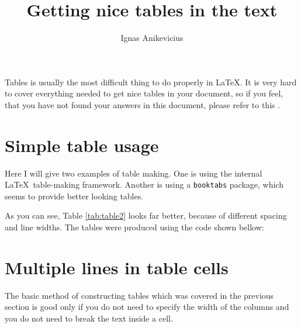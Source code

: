 

\usepackage[]{amsmath}
\usepackage{blindtext}
\usepackage{multicol}
\usepackage[english,british]{babel}

\usepackage{stfloats}
\usepackage{booktabs}
\usepackage{array}

\title{Getting nice tables in the text}
\author{Ignas Anikevicius}



\maketitle

Tables is usually the most difficult thing to do properly in \LaTeX . It is very
hard to cover everything needed to get nice tables in your document, so if you
feel, that you have not found your answers in this document, please refer to
this 
.

\tableofcontents

\section{Simple table usage}

Here I will give two examples of table making. One is using the internal \LaTeX\
table-making framework. Another is using a \verb|booktabs| package, which seems
to provide better looking tables.




As you can see, Table \ref{tab:table2} looks far better, because of different
spacing and line widths. The tables were produced using the code shown bellow:



\section{Multiple lines in table cells}

The basic method of constructing tables which was covered in the previous
section is good only if you do not need to specify the width of the columns and
you do not need to break the text inside a cell.

